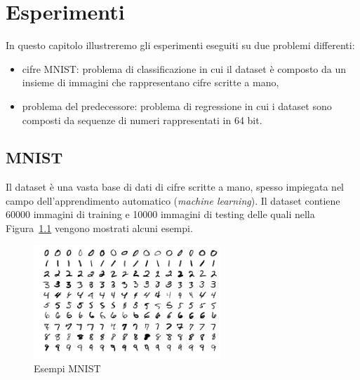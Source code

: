 \documentclass[11pt,a4paper,twoside,
openright]{book}
\begin{document}
\chapter{Esperimenti}
\label{esperimenti}
In questo capitolo illustreremo gli esperimenti eseguiti su due problemi differenti:
\begin{itemize}
\item cifre MNIST: problema di classificazione in cui il dataset è composto da un insieme di immagini che rappresentano cifre scritte a mano,
\item problema del predecessore: problema di regressione in cui i dataset sono composti da sequenze di numeri rappresentati in 64 bit.
\end{itemize}

\section{MNIST}
Il dataset è una vasta base di dati di cifre scritte a mano, spesso impiegata nel campo dell'apprendimento automatico (\textit{machine learning}).
Il dataset contiene 60000 immagini di training e 10000 immagini di testing delle quali nella Figura~\ref{fig:mnist} vengono mostrati alcuni esempi.
\begin{figure}
\begin{center}
\includegraphics[width=200pt]{MnistExamples.png}
\caption{Esempi MNIST~\cite{pict_mnist}}
\end{center}
\label{fig:mnist}
\end{figure}
\end{document}
